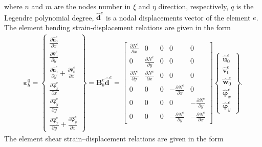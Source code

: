 \documentclass[11pt,a4paper,final]{report}
\theoremstyle{plain}
\begin{document}
where \(n\) and \(m\) are the nodes number in \(\xi\) and \(\eta\) direction, respectively, \(q\) is the Legendre polynomial degree,  $\widehat{\textbf{d}}^e$ is a nodal displacements vector of the element $e$.
The element bending strain-displacement relations are given in the form
\begin{eqnarray}
	\boldsymbol{\varepsilon}_b^0 = 
	\left \{ \begin{array}{c}
		\frac{\partial \widehat{\textbf{u}}_0^e}{\partial x} \\
		\frac{\partial \widehat{\textbf{v}}_0^e}{\partial y} \\
		\frac{\partial \widehat{\textbf{u}}_0^e}{\partial y} + \frac{\partial \widehat{\textbf{v}}_0^e}{\partial x}\\
		\frac{\partial \widehat{\boldsymbol{\varphi}}_x^e}{\partial x} \\
		\frac{\partial \widehat{\boldsymbol{\varphi}}_y^e}{\partial y} \\
		\frac{\partial \widehat{\boldsymbol{\varphi}}_x^e}{\partial y} + \frac{\partial \widehat{\boldsymbol{\varphi}}_y^e}{\partial x}
	\end{array} \right\} = 
	\textbf{B}_b^e\widehat{\textbf{d}}^e = 
	\left [
	\begin{array}{ccccc}
		\frac{\partial N^e}{\partial x} & 0 & 0 & 0 & 0\\
		0 & \frac{\partial N^e}{\partial y} & 0 & 0 & 0\\
		\frac{\partial N^e}{\partial y} & \frac{\partial N^e}{\partial x} & 0 & 0 & 0\\
		0 & 0 & 0 & -\frac{\partial N^e}{\partial x} & 0\\
		0 & 0 & 0 & 0 & -\frac{\partial N^e}{\partial y}\\
		0 & 0 & 0 & -\frac{\partial N^e}{\partial y} & -\frac{\partial N^e}{\partial x}
	\end{array} \right]
	\left \{ \begin{array}{c}
		\widehat{\textbf{u}}_0^e \\
		\widehat{\textbf{v}}_0^e \\
		\widehat{\textbf{w}}_0^e \\
		\widehat{\boldsymbol{\varphi}}_x^e \\
		\widehat{\boldsymbol{\varphi}}_y^e
	\end{array} \right\}.
\end{eqnarray}
The element shear strain--displacement relations are given in the form
\end{document}
